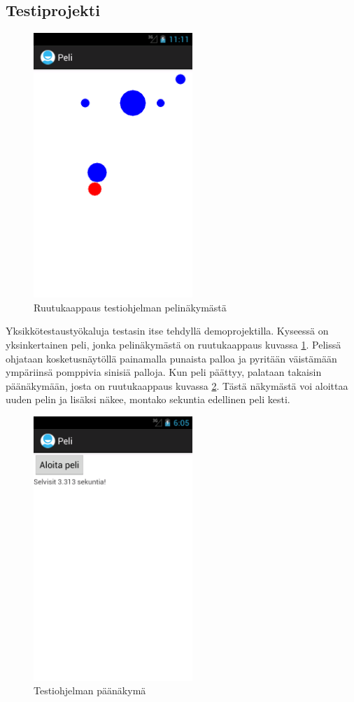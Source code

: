 \subsection{Testiprojekti}

\begin{figure}[htb]
\includegraphics[width=60mm]{peli_screenshot.png}
\caption{Ruutukaappaus testiohjelman pelinäkymästä} \label{peli_screenshot}
\end{figure}

Yksikkötestaustyökaluja testasin itse tehdyllä demoprojektilla. Kyseessä on yksinkertainen peli, jonka pelinäkymästä on ruutukaappaus kuvassa \ref{peli_screenshot}. Pelissä ohjataan kosketusnäytöllä painamalla punaista palloa ja pyritään väistämään ympäriinsä pomppivia sinisiä palloja. Kun peli päättyy, palataan takaisin päänäkymään, josta on ruutukaappaus kuvassa \ref{mainactivity}. Tästä näkymästä voi aloittaa uuden pelin ja lisäksi näkee, montako sekuntia edellinen peli kesti.

\begin{figure}[htb]
\includegraphics[width=60mm]{peli_mainactivity.png}
\caption{Testiohjelman päänäkymä} \label{mainactivity}
\end{figure}

